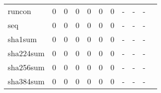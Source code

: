 \begin{longtable}{lp{1.20cm}p{1.20cm}p{1.20cm}p{1.20cm}p{1.20cm}p{1.20cm}p{1.20cm}p{1.20cm}p{1.20cm}p{1.20cm}}
runcon    &                                     0 &                                                  0 &                                                  0 &                                                  0 &                                                  0 &                                                  0 &                                             - &                                                  - &                                                  - \\
seq       &                                     0 &                                                  0 &                                                  0 &                                                  0 &                                                  0 &                                                  0 &                                             - &                                                  - &                                                  - \\
sha1sum   &                                     0 &                                                  0 &                                                  0 &                                                  0 &                                                  0 &                                                  0 &                                             - &                                                  - &                                                  - \\
sha224sum &                                     0 &                                                  0 &                                                  0 &                                                  0 &                                                  0 &                                                  0 &                                             - &                                                  - &                                                  - \\
sha256sum &                                     0 &                                                  0 &                                                  0 &                                                  0 &                                                  0 &                                                  0 &                                             - &                                                  - &                                                  - \\
sha384sum &                                     0 &                                                  0 &                                                  0 &                                                  0 &                                                  0 &                                                  0 &                                             - &                                                  - &                                                  - \\

\end{longtable}
